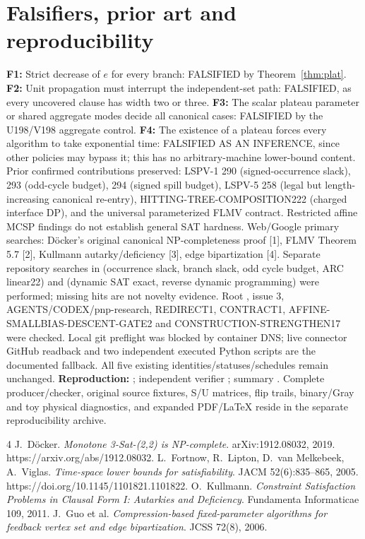 \documentclass[11pt]{article}
\begin{document}
\section{Falsifiers, prior art and reproducibility}
\noindent\textbf{F1:} Strict decrease of $e$ for every branch: FALSIFIED by Theorem~\ref{thm:plat}. \textbf{F2:} Unit propagation must interrupt the independent-set path: FALSIFIED, as every uncovered clause has width two or three. \textbf{F3:} The scalar plateau parameter or shared aggregate modes decide all canonical cases: FALSIFIED by the U198/V198 aggregate control. \textbf{F4:} The existence of a plateau forces every algorithm to take exponential time: FALSIFIED AS AN INFERENCE, since other policies may bypass it; this has no arbitrary-machine lower-bound content.
Prior confirmed contributions preserved: LSPV-1 290 (signed-occurrence slack), 293 (odd-cycle budget), 294 (signed spill budget), LSPV-5 258 (legal but length-increasing canonical re-entry), HITTING-TREE-COMPOSITION222 (charged interface DP), and the universal parameterized FLMV contract. Restricted affine MCSP findings do not establish general SAT hardness.
Web/Google primary searches: D\"ocker's original canonical NP-completeness proof [1], FLMV Theorem 5.7 [2], Kullmann autarky/deficiency [3], edge bipartization [4]. Separate repository searches in  (occurrence slack, branch slack, odd cycle budget, ARC linear22) and  (dynamic SAT exact, reverse dynamic programming) were performed; missing hits are not novelty evidence. Root , issue 3, AGENTS/CODEX/pnp-research, REDIRECT1, CONTRACT1, AFFINE-SMALLBIAS-DESCENT-GATE2 and CONSTRUCTION-STRENGTHEN17 were checked. Local git preflight was blocked by container DNS; live connector GitHub readback and two independent executed Python scripts are the documented fallback. All five existing identities/statuses/schedules remain unchanged.
\noindent\textbf{Reproduction:} ; independent verifier ; summary . Complete producer/checker, original source fixtures, S/U matrices, flip trails, binary/Gray and toy physical diagnostics, and expanded PDF/LaTeX reside in the separate reproducibility archive.
\begin{thebibliography}{4}
 J.~D\"ocker. \emph{Monotone 3-Sat-(2,2) is NP-complete}. arXiv:1912.08032, 2019. https://arxiv.org/abs/1912.08032.
 L.~Fortnow, R.~Lipton, D.~van Melkebeek, A.~Viglas. \emph{Time-space lower bounds for satisfiability}. JACM 52(6):835--865, 2005. https://doi.org/10.1145/1101821.1101822.
 O.~Kullmann. \emph{Constraint Satisfaction Problems in Clausal Form I: Autarkies and Deficiency}. Fundamenta Informaticae 109, 2011.
 J.~Guo et al. \emph{Compression-based fixed-parameter algorithms for feedback vertex set and edge bipartization}. JCSS 72(8), 2006.
\end{thebibliography}
\end{document}
